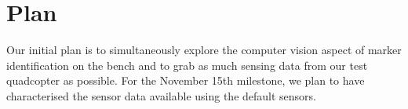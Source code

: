 \section*{Plan}
Our initial plan is to simultaneously explore the computer vision aspect of marker identification on the bench and to grab as much sensing data from our test quadcopter as possible. For the November 15th milestone, we plan to have characterised the sensor data available using the default sensors.